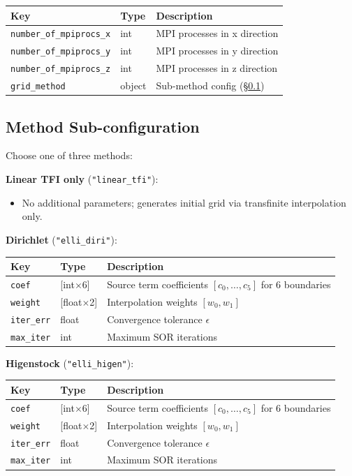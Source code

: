 \documentclass[11pt,a4paper]{report}
\begin{document}
\begin{longtable}{p{5.5cm} p{2cm} p{7cm}}
\toprule
\textbf{Key} & \textbf{Type} & \textbf{Description} \\
\midrule
\texttt{number\_of\_mpiprocs\_x} & int & MPI processes in x direction \\
\texttt{number\_of\_mpiprocs\_y} & int & MPI processes in y direction \\
\texttt{number\_of\_mpiprocs\_z} & int & MPI processes in z direction \\
\texttt{grid\_method} & object & Sub-method config (\S\ref{sec:method-config}) \\
\bottomrule
\end{longtable}

\subsection{Method Sub-configuration}
\label{sec:method-config}

Choose one of three methods:

\textbf{Linear TFI only} (\texttt{"linear\_tfi"}):
\begin{itemize}
    \item No additional parameters; generates initial grid via transfinite interpolation only.
\end{itemize}

\textbf{Dirichlet} (\texttt{"elli\_diri"}):
\begin{longtable}{p{5.5cm} p{2cm} p{7cm}}
\toprule
\textbf{Key} & \textbf{Type} & \textbf{Description} \\
\midrule
\texttt{coef} & [int$\times$6] & Source term coefficients $[c_0, \ldots, c_5]$ for 6 boundaries \\
\texttt{weight} & [float$\times$2] & Interpolation weights $[w_0, w_1]$ \\
\texttt{iter\_err} & float & Convergence tolerance $\epsilon$ \\
\texttt{max\_iter} & int & Maximum SOR iterations \\
\bottomrule
\end{longtable}

\textbf{Higenstock} (\texttt{"elli\_higen"}):
\begin{longtable}{p{5.5cm} p{2cm} p{7cm}}
\toprule
\textbf{Key} & \textbf{Type} & \textbf{Description} \\
\midrule
\texttt{coef} & [int$\times$6] & Source term coefficients $[c_0, \ldots, c_5]$ for 6 boundaries \\
\texttt{weight} & [float$\times$2] & Interpolation weights $[w_0, w_1]$ \\
\texttt{iter\_err} & float & Convergence tolerance $\epsilon$ \\
\texttt{max\_iter} & int & Maximum SOR iterations \\
\bottomrule
\end{longtable}
\end{document}
